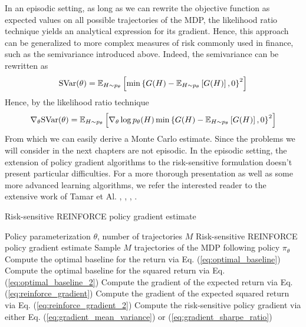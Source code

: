 In an episodic setting, as long as we can rewrite the objective function as expected values on all possible trajectories of the MDP, the likelihood ratio technique yields an analytical expression for its gradient. Hence, this approach can be generalized to more complex measures of risk commonly used in finance, such as the semivariance introduced above. Indeed, the semivariance can be rewritten as 
\begin{equation}
	\text{SVar}(\theta) = \E[H \sim p_\theta]{\min\left\{G(H) - \E[H \sim p_\theta]{G(H)}, 0\right\}^2}
\end{equation}
Hence, by the likelihood ratio technique
\begin{equation}
	\nabla_\theta \text{SVar}(\theta) = \E[H \sim p_\theta]{\nabla_\theta \log p_\theta(H) \min\left\{G(H) - \E[H \sim p_\theta]{G(H)}, 0\right\}^2}
\end{equation}
From which we can easily derive a Monte Carlo estimate. Since the problems we will consider in the next chapters are not episodic. In the episodic setting, the extension of policy gradient algorithms to the risk-sensitive formulation doesn't present particular difficulties. For a more thorough presentation as well as some more advanced learning algorithms, we refer the interested reader to the extensive work of Tamar et Al.  \cite{tamar2013temporal}, \cite{tamar2013variance}, \cite{tamar2015policy}, \cite{chow2015risk}.
\begin{algorithm}[t]
	\caption{Risk-sensitive REINFORCE policy gradient estimate}
	\label{algo:RSreinforce}
	\begin{algorithmic}[1]
		\Require Policy parameterization $\theta$, number of trajectories $M$
		\Ensure Risk-sensitive REINFORCE policy gradient estimate
		\State Sample $M$ trajectories of the MDP following policy $\pi_\theta$
		\State Compute the optimal baseline for the return via Eq. (\ref{eq:optimal_baseline})
		\State Compute the optimal baseline for the squared return via Eq. (\ref{eq:optimal_baseline_2})
		\State Compute the gradient of the expected return via Eq. (\ref{eq:reinforce_gradient})
		\State Compute the gradient of the expected squared return via Eq. (\ref{eq:reinforce_gradient_2})
		\State Compute the risk-sensitive policy gradient via either Eq. (\ref{eq:gradient_mean_variance}) or (\ref{eq:gradient_sharpe_ratio})
	\end{algorithmic}
\end{algorithm}

